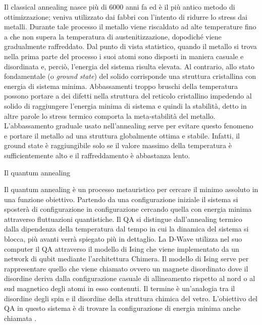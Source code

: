 \cite{QA,QVC,ST}Il classical annealing  nasce più di 6000 anni fa ed è il più antico metodo di ottimizzazione; veniva utilizzato dai fabbri con l'intento di ridurre lo stress dai metalli. Durante tale processo il metallo viene riscaldato ad alte temperature fino a che non supera la temperatura di austenitizzazione, dopodiché viene gradualmente raffreddato.
Dal punto di vista statistico, quando il metallo si trova nella prima parte del processo i suoi atomi sono disposti in maniera casuale e disordinata e, perciò, l’energia del sistema risulta elevata. Al contrario, allo stato fondamentale (o \textit{ground state}) del solido corrisponde una struttura cristallina con energia di sistema minima.
Abbassamenti troppo bruschi della temperatura possono portare a dei difetti nella struttura del reticolo cristallino impedendo al solido di raggiungere l’energia minima di sistema e quindi la stabilità, detto in altre parole lo stress termico comporta la meta-stabilità del metallo. L’abbassamento graduale usato nell’annealing serve per evitare questo fenomeno e portare il metallo ad una struttura globalmente ottima e stabile. Infatti, il ground state è raggiungibile solo se il valore massimo della temperatura è sufficientemente alto e il raffreddamento è abbastanza lento.

\cite{QVC}Il quantum annealing

\cite{QAS}Il quantum annealing  è un processo metauristico per cercare il minimo assoluto in una funzione obiettivo. Partendo da una configurazione iniziale il sistema si sposterà di configurazione in configurazione cercando quella con energia minima attraverso fluttuazioni quantistiche. Il QA si distingue dall'annealing termico dalla dipendenza della temperatura dal tempo in cui la dinamica del sistema si blocca, più avanti verrà spiegato più in dettaglio. La D-Wave utilizza nel suo computer il QA attraverso il modello di Ising che viene implementato da un network di qubit mediante l'architettura Chimera. Il modello di Ising serve per rappresentare quello che viene chiamato  ovvero un magnete disordinato dove il disordine deriva dalla configurazione casuale di allineamento rispetto al nord o al sud magnetico degli atomi in esso contenuti. Il termine  è un'analogia tra il disordine degli spin e il disordine della struttura chimica del vetro. L'obiettivo del QA in questo sistema è di trovare la configurazione di energia minima anche chiamata .

